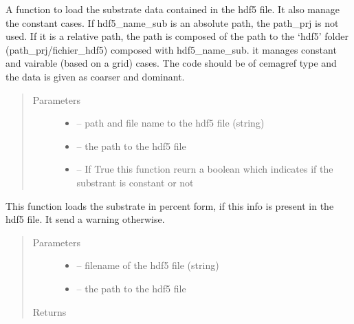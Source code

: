 \documentclass[letterpaper,10pt,english]{sphinxmanual}
\begin{document}
\begin{fulllineitems}
\label{\detokenize{index:src.load_hdf5.load_hdf5_sub}}
A function to load the substrate data contained in the hdf5 file. It also manage
the constant cases. If hdf5\_name\_sub is an absolute path, the path\_prj is not used. If it is a relative path,
the path is composed of the path to the `hdf5' folder (path\_prj/fichier\_hdf5) composed with hdf5\_name\_sub. it manages constant and
vairable (based on a grid) cases. The code should be of cemagref type and the data is given as coarser and dominant.
\begin{quote}\begin{description}
\item[{Parameters}] \leavevmode\begin{itemize}
\item {} 
 -- path and file name to the hdf5 file (string)

\item {} 
 -- the path to the hdf5 file

\item {} 
 -- If True this function reurn a boolean which indicates if the substrant is constant or not

\end{itemize}

\end{description}\end{quote}

\end{fulllineitems}


\begin{fulllineitems}
\label{\detokenize{index:src.load_hdf5.load_sub_percent}}
This function loads the substrate in percent form, if this info is present in the hdf5 file. It send a warning
otherwise.
\begin{quote}\begin{description}
\item[{Parameters}] \leavevmode\begin{itemize}
\item {} 
 -- filename of the hdf5 file (string)

\item {} 
 -- the path to the hdf5 file

\end{itemize}

\item[{Returns}] \leavevmode


\end{description}\end{quote}

\end{fulllineitems}
\end{document}
